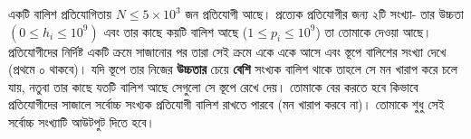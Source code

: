 \begin{example}
\label{pillow_tower}
একটি বালিশ প্রতিযোগিতায় $N \le 5\times 10^3$ জন প্রতিযোগী আছে। প্রত্যেক প্রতিযোগীর জন্য ২টি সংখ্যা- তার উচ্চতা $(0 \le h_i \le 10^9)$ এবং তার কাছে কয়টি বালিশ আছে ($1 \le p_i \le 10^9$) তা তোমাকে দেওয়া আছে। প্রতিযোগীদের নির্দিষ্ট একটি ক্রমে সাজানোর পর তারা সেই ক্রমে একে একে আসে এবং স্তূপে বালিশের সংখ্যা দেখে (প্রথমে ০ থাকবে)। যদি স্তূপে তার নিজের \textbf{উচ্চতার} চেয়ে \textbf{বেশি} সংখ্যক বালিশ থাকে তাহলে সে মন খারাপ করে চলে যায়, নতুবা তার কাছে যতটি বালিশ আছে সেগুলো সে স্তূপে রেখে দেয়। তোমাকে বের করতে হবে কিভাবে প্রতিযোগীদের সাজালে সর্বোচ্চ সংখ্যক প্রতিযোগী বালিশ রাখতে পারবে (মন খারাপ করবে না)। তোমাকে শুধু সেই সর্বোচ্চ সংখ্যাটি আউটপুট দিতে হবে।
\end{example}
